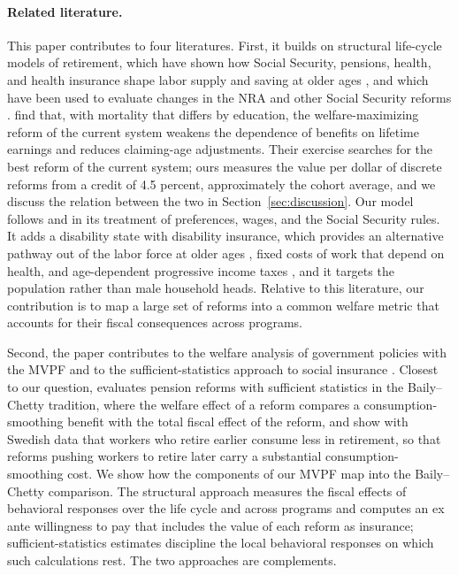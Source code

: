 \paragraph{Related literature.} This paper contributes to four literatures. First, it builds on structural life-cycle models of retirement, which have shown how Social Security, pensions, health, and health insurance shape labor supply and saving at older ages \citep{Gustman1986structural,rust1989dynamic,Rust1997how,french2005effects,vanderKlaauw2008social,Denardi2010,french2011effects,Haan2014,Low2015,blundell2016retirement,Denardi2018,fan2024estimation}, and which have been used to evaluate changes in the NRA and other Social Security reforms \citep{Conesa1999social,Imrohoroglu2012,Kitao2014sustainable,Laun2015life,Li2018,Bairoliya2023}. \citet{Jones2023} find that, with mortality that differs by education, the welfare-maximizing reform of the current system weakens the dependence of benefits on lifetime earnings and reduces claiming-age adjustments. Their exercise searches for the best reform of the current system; ours measures the value per dollar of discrete reforms from a credit of 4.5 percent, approximately the cohort average, and we discuss the relation between the two in Section~\ref{sec:discussion}. Our model follows \citet{french2005effects} and \citet{french2011effects} in its treatment of preferences, wages, and the Social Security rules. It adds a disability state with disability insurance, which provides an alternative pathway out of the labor force at older ages \citep{Maestas2013,French2014,Low2015,Yu2024}, fixed costs of work that depend on health, and age-dependent progressive income taxes \citep{Borella2023}, and it targets the population rather than male household heads. Relative to this literature, our contribution is to map a large set of reforms into a common welfare metric that accounts for their fiscal consequences across programs.

Second, the paper contributes to the welfare analysis of government policies with the MVPF \citep{hendren2016policy,hendren2020unified} and to the sufficient-statistics approach to social insurance \citep{Chetty2009sufficient,Kleven2021sufficient}. Closest to our question, \citet{haller2022welfare} evaluates pension reforms with sufficient statistics in the Baily--Chetty tradition, where the welfare effect of a reform compares a consumption-smoothing benefit with the total fiscal effect of the reform, and \citet{Kolsrud2024retirement} show with Swedish data that workers who retire earlier consume less in retirement, so that reforms pushing workers to retire later carry a substantial consumption-smoothing cost. We show how the components of our MVPF map into the Baily--Chetty comparison. The structural approach measures the fiscal effects of behavioral responses over the life cycle and across programs and computes an ex ante willingness to pay that includes the value of each reform as insurance; sufficient-statistics estimates discipline the local behavioral responses on which such calculations rest. The two approaches are complements.

